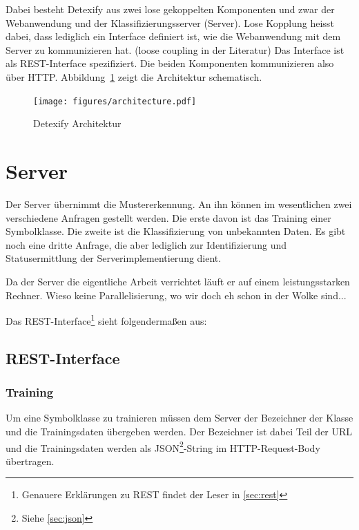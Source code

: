 Dabei besteht Detexify aus zwei lose gekoppelten Komponenten und zwar der Webanwendung und der Klassifizierungsserver (Server). Lose Kopplung heisst dabei, dass lediglich ein Interface definiert ist, wie die Webanwendung mit dem Server zu kommunizieren hat. (\TODO loose coupling in der Literatur) Das Interface ist als \ac{REST}-Interface spezifiziert. Die beiden Komponenten kommunizieren also über \ac{HTTP}. Abbildung~\ref{fig:architecture} zeigt die Architektur schematisch.

\begin{figure}
  \centering \texttt{[image: figures/architecture.pdf]}
  \caption{Detexify Architektur}
  \label{fig:architecture}
\end{figure}

\section{Server} %
\label{sec:server}

Der Server übernimmt die Mustererkennung. An ihn können im wesentlichen zwei verschiedene Anfragen gestellt werden. Die erste davon ist das Training einer Symbolklasse. Die zweite ist die Klassifizierung von unbekannten Daten. Es gibt noch eine dritte Anfrage, die aber lediglich zur Identifizierung und Statusermittlung der Serverimplementierung dient.

Da der Server die eigentliche Arbeit verrichtet läuft er auf einem leistungsstarken Rechner. \TODO Wieso keine Parallelisierung, wo wir doch eh schon in der Wolke sind...

Das \ac{REST}-Interface\footnote{Genauere Erklärungen zu \ac{REST} findet der Leser in \ref{sec:rest}} sieht folgendermaßen aus:

\subsection{REST-Interface} %
\label{sub:rest_interface}

\subsubsection{Training}

Um eine Symbolklasse zu trainieren müssen dem Server der Bezeichner der Klasse und die Trainingsdaten übergeben werden. Der Bezeichner ist dabei Teil der \ac{URL} und die Trainingsdaten werden als \ac{JSON}\footnote{Siehe \ref{sec:json}}-String im \ac{HTTP}-Request-Body übertragen.

